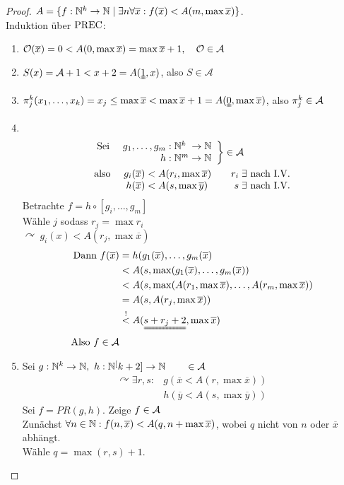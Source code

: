 \begin{proof}
	$A=\{f:\N^k\->\N \mid \exists n \forall\overline{x}:f(\overline{x})< A(m,\max\overline{x})\}$.\\
	Induktion über $\operatorname{PREC}$:
	\begin{enumerate}
	\item $\mathcal{O}(\overline{x})=0 < A(0,\max\overline{x})=\max \overline{x}+1,\quad \mathcal{O}\in\mathcal{A}$
	\item $S(x)=\A+1 < x+2 = A(\uuline{1},x)$, also $S\in \mathcal A$
	\item $\pi^k_j(x_1,\dots,x_k) = x_j\leq \max\overline{x} < \max \overline{x} +1 = A(\uuline{0},\max \overline{x})$, also $\pi^k_j\in\mathcal{A}$
	\item\ \vspace{-2em}
		\begin{align*}
			&\left.\begin{array}{rr<{{}}@{}l}
				\text{Sei } & g_1,\dots,g_m : &\N^k\;\->\N\\
				& h : &\N^m\->\N
			\end{array}\right\rbrace \in\A\\
			&\begin{array}{rr@{}>{{}}l@{\qquad}r@{\;}l}
				\text{also } &g_i(\overline{x}) &< A(r_i,\max\overline{x}) & r_i &\exists \text{ nach I.V.}\\
				&h(\overline{x}) &< A(s,\max\overline{y}) &s &\exists \text{ nach I.V.}
			\end{array}
		\end{align*}
		\newpage
		Betrachte $f= h\circ [g_i,\dots,g_m]$\\
		Wähle $j$ sodass $r_j=\max r_i$\\
		$\curvearrowright\ g_i(x) < A(r_j,\max\overline{x})$
		\begin{align*}
			\text{Dann }f(\overline{x}) &= h(g_1(\overline{x}),\dots,g_m(\overline{x})\\
			&< A(s,\max(g_1(\overline{x}),\dots,g_m(\overline{x}))\\
			&< A(s,\max(A(r_1,\max\overline{x}), \dots, A(r_m,\max\overline{x}))\\
			&= A(s,A(r_j,\max\overline{x}))\\
			&\overset!< A(\uuline{s+r_j+2},\max\overline{x})\\
			\text{Also }f\in\A
		\end{align*}
	\item Sei $g:\N^k\->\N,\ h:\N^[k+2]\->\N\qquad \in\A$
		\begin{align*}
			\curvearrowright \exists r,s :{}& g(\overline{x}< A(r,\max\overline{x}))\\
			& h(\overline{y}< A(s,\max\overline{y}))
		\end{align*}
		Sei $f= PR(g,h)$. Zeige $f\in\mathcal{A}$\\
		Zunächst $\forall n\in\mathbb{N}: f(n,\overline{x}) < A(q,n+\max\overline x)$, wobei $q$ nicht von $n$ oder $\overline{x}$ abhängt.\\
		Wähle $q=\max(r,s)+1$.
		

\end{enumerate}
\end{proof}

